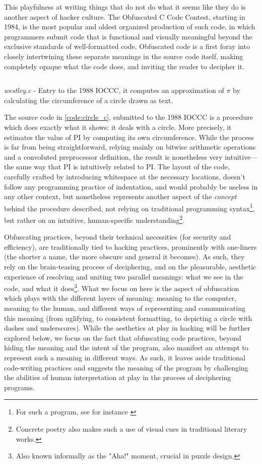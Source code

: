 This playfulness at writing things that do not do what it seems like they do is another aspect of hacker culture. The Obfuscated C Code Contest, starting in 1984, is the most popular and oldest organized production of such code, in which programmers submit code that is functional and visually meaningful beyond the exclusive standards of well-formatted code. Obfuscated code is a first foray into closely intertwining these separate meanings in the source code itself, making completely opaque what the code does, and inviting the reader to decipher it.

\begin{listing}
  \inputminted{c}{./corpus/circle.c}
  \caption{\emph{westley.c} - Entry to the 1988 IOCCC, it computes an approximation of $\pi$ by calculating the circumference of a circle drawn as text. \citep{westley_international_1988}}
  \label{code:circle_c}
\end{listing}

The source code in \autoref{code:circle_c}, submitted to the 1988 IOCCC is a procedure which does exactly what it shows: it deals with a circle. More precisely, it estimates the value of PI by computing its own circumference. While the process is far from being straightforward, relying mainly on bitwise arithmetic operations and a convoluted preprocessor definition, the result is nonetheless very intuitive—the same way that PI is intuitively related to PI. The layout of the code, carefully crafted by introducing whitespace at the necessary locations, doesn't follow any programming practice of indentation, and would probably be useless in any other context, but nonetheless represents another aspect of the \emph{concept} behind the procedure described, not relying on traditional programming syntax\footnote{For such a program, see for instance \citep{lynn_pi_2004}}, but rather on an intuitive, human-specific understanding\footnote{Concrete poetry also makes such a use of visual cues in traditional literary works.}.

Obfuscating practices, beyond their technical necessities (for security and efficiency), are traditionally tied to hacking practices, prominently with one-liners (the shorter a name, the more obscure and general it becomes). As such, they rely on the brain-teasing process of deciphering, and on the pleasurable, aesthetic experience of resolving and uniting two parallel meanings: what we see in the code, and what it does\footnote{Also known informally as the "Aha!" moment, crucial in puzzle design.}. What we focus on here is the aspect of obfuscation which plays with the different layers of meaning: meaning to the computer, meaning to the human, and different ways of representing and communicating this meaning (from uglifying, to consistent formatting, to depicting a circle with dashes and underscores). While the aesthetics at play in hacking will be further explored below, we focus on the fact that obfuscating code practices, beyond hiding the meaning and the intent of the program, also manifest an attempt to represent such a meaning in different ways. As such, it leaves aside traditional code-writing practices and suggests the meaning of the program by challenging the abilities of human interpretation at play in the process of deciphering programs.

